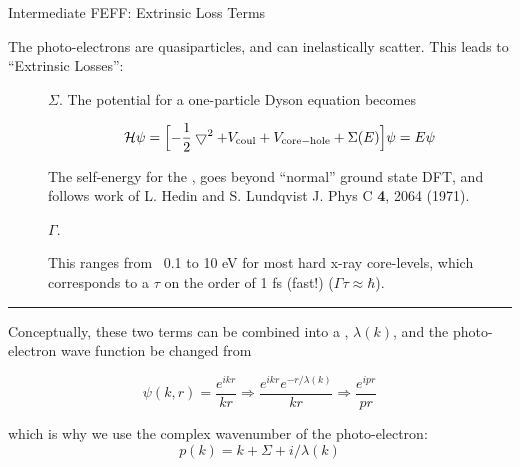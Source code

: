 \begin{slide}{Intermediate FEFF: Extrinsic Loss Terms}
  
  \vmm
    The photo-electrons are quasiparticles, and can inelastically scatter.
    This leads to ``Extrinsic Losses'':

    \begin{description}
    \item[{}] $\Sigma$.  The potential for a one-particle Dyson
      equation becomes 
      
      \[ {\cal{H}}\psi = \Bigl[ -{\frac{1}{2}}\bigtriangledown^2 + V_{\rm
        coul} + V_{\rm core-hole} + \Sigma(E) \Bigr] \psi = E\psi
      \]

      
      The self-energy for the {}, goes beyond
      ``normal'' ground state DFT, and follows work of L. Hedin and S.
      Lundqvist J. Phys C {\bf{4}}, 2064 (1971).

      
    \item[{}] $\Gamma$.  
      
      This ranges from ~0.1 to 10 eV for most hard x-ray core-levels, which
      corresponds to a {} $\tau$ on the order
      of 1 fs (fast!)  ($\Gamma \tau \approx \hbar$).

    \end{description}

    \vmm \hrule \vmm
    
    Conceptually, these two terms can be combined into a {}, ${\lambda(k)}$, and the photo-electron wave
    function be changed from
    
    \[ \displaystyle{{
        \psi(k,r)  =  {\frac{e^{ikr}}{kr}} \Rightarrow   {\frac{e^{ikr}e^{-r/\lambda(k)}}{kr}}
        \Rightarrow {\frac{e^{ipr}}{pr}} }}
    \]

    which is why we use the complex wavenumber of the photo-electron:
    \[{p(k) = k + \Sigma + i / \lambda(k) } \]

\vfill
\end{slide} 

